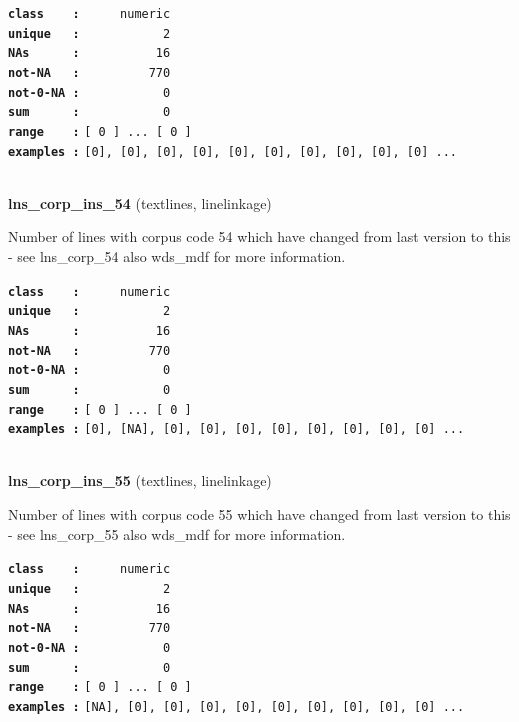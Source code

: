 \documentclass[]{article}
\begin{document}
\textbf{\texttt{class\ \ \ \ :}} \texttt{~~~~~numeric}\\
\textbf{\texttt{unique\ \ \ :}} \texttt{~~~~~~~~~~~2}\\
\textbf{\texttt{NAs\ \ \ \ \ \ :}} \texttt{~~~~~~~~~~16}\\
\textbf{\texttt{not-NA\ \ \ :}} \texttt{~~~~~~~~~770}\\
\textbf{\texttt{not-0-NA\ :}} \texttt{~~~~~~~~~~~0}\\
\textbf{\texttt{sum\ \ \ \ \ \ :}} \texttt{~~~~~~~~~~~0}\\
\textbf{\texttt{range\ \ \ \ :}}
\texttt{{[}\ 0\ {]}\ ...\ {[}\ 0\ {]}}\\
\textbf{\texttt{examples\ :}}
\texttt{{[}0{]},\ {[}0{]},\ {[}0{]},\ {[}0{]},\ {[}0{]},\ {[}0{]},\ {[}0{]},\ {[}0{]},\ {[}0{]},\ {[}0{]}\ ...}\\

~

\textbf{lns\_corp\_ins\_54} (textlines, linelinkage)

Number of lines with corpus code 54 which have changed from last version
to this - see lns\_corp\_54 also wds\_mdf for more information.

\textbf{\texttt{class\ \ \ \ :}} \texttt{~~~~~numeric}\\
\textbf{\texttt{unique\ \ \ :}} \texttt{~~~~~~~~~~~2}\\
\textbf{\texttt{NAs\ \ \ \ \ \ :}} \texttt{~~~~~~~~~~16}\\
\textbf{\texttt{not-NA\ \ \ :}} \texttt{~~~~~~~~~770}\\
\textbf{\texttt{not-0-NA\ :}} \texttt{~~~~~~~~~~~0}\\
\textbf{\texttt{sum\ \ \ \ \ \ :}} \texttt{~~~~~~~~~~~0}\\
\textbf{\texttt{range\ \ \ \ :}}
\texttt{{[}\ 0\ {]}\ ...\ {[}\ 0\ {]}}\\
\textbf{\texttt{examples\ :}}
\texttt{{[}0{]},\ {[}NA{]},\ {[}0{]},\ {[}0{]},\ {[}0{]},\ {[}0{]},\ {[}0{]},\ {[}0{]},\ {[}0{]},\ {[}0{]}\ ...}\\

~

\textbf{lns\_corp\_ins\_55} (textlines, linelinkage)

Number of lines with corpus code 55 which have changed from last version
to this - see lns\_corp\_55 also wds\_mdf for more information.

\textbf{\texttt{class\ \ \ \ :}} \texttt{~~~~~numeric}\\
\textbf{\texttt{unique\ \ \ :}} \texttt{~~~~~~~~~~~2}\\
\textbf{\texttt{NAs\ \ \ \ \ \ :}} \texttt{~~~~~~~~~~16}\\
\textbf{\texttt{not-NA\ \ \ :}} \texttt{~~~~~~~~~770}\\
\textbf{\texttt{not-0-NA\ :}} \texttt{~~~~~~~~~~~0}\\
\textbf{\texttt{sum\ \ \ \ \ \ :}} \texttt{~~~~~~~~~~~0}\\
\textbf{\texttt{range\ \ \ \ :}}
\texttt{{[}\ 0\ {]}\ ...\ {[}\ 0\ {]}}\\
\textbf{\texttt{examples\ :}}
\texttt{{[}NA{]},\ {[}0{]},\ {[}0{]},\ {[}0{]},\ {[}0{]},\ {[}0{]},\ {[}0{]},\ {[}0{]},\ {[}0{]},\ {[}0{]}\ ...}\\
\end{document}
